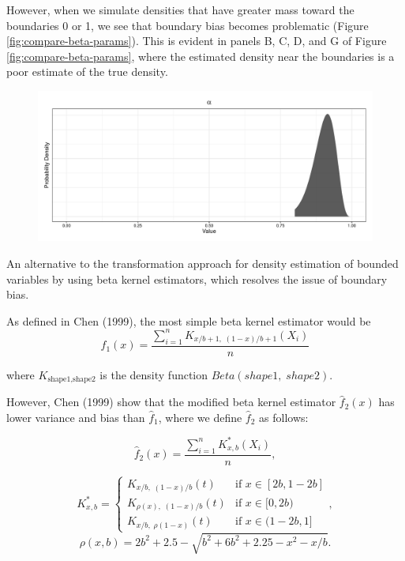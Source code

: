 \documentclass[12pt,twoside]{smiththesis}
\begin{document}
However, when we simulate densities that have greater mass toward the boundaries 0 or 1, we see that boundary bias becomes problematic (Figure \ref{fig:compare-beta-params}). This is evident in panels B, C, D, and G of Figure \ref{fig:compare-beta-params}, where the estimated density near the boundaries is a poor estimate of the true density.
\begin{figure}

{\centering \includegraphics[width=1\linewidth]{thesis_files/figure-latex/unnamed-chunk-35-1} 

}

\caption{\label{fig:compare-beta-params}}\label{fig:unnamed-chunk-35}
\end{figure}
An alternative to the transformation approach for density estimation of bounded variables by using beta kernel estimators, which resolves the issue of boundary bias.

As defined in Chen (1999), the most simple beta kernel estimator would be
\[\hat f_1(x) = \dfrac{\sum_{i=1}^n K_{x/b + 1, \; (1-x)/b + 1} (X_i)}{n}\]

where \(K_{\text{shape1}, \text{shape2}}\) is the density function \(Beta(shape1, \; shape2)\).

However, Chen (1999) show that the modified beta kernel estimator \(\hat f_2(x)\) has lower variance and bias than \(\hat f_1\), where we define \(\hat f_2\) as follows:

\[
\hat f_2(x)  = \dfrac{\sum_{i=1}^n K_{x,b}^*(X_i)}{n},\]

\[K^*_{x,b} = \begin{cases}K_{x/b, \; (1-x)/b }(t)  & \text{if }x \in [2b,1-2b] \\
K_{\rho(x), \; (1-x)/b } (t)  & \text{if } x \in [0,2b) \\
K_{x/b, \; \rho(1-x)}(t) & \text{if } x\in(1-2b,1]
\end{cases},
\]
\[\rho(x,b) = 2b^2 + 2.5 - \sqrt{b^2 + 6b^2 +2.25-x^2 -x/b}.\]
\end{document}
